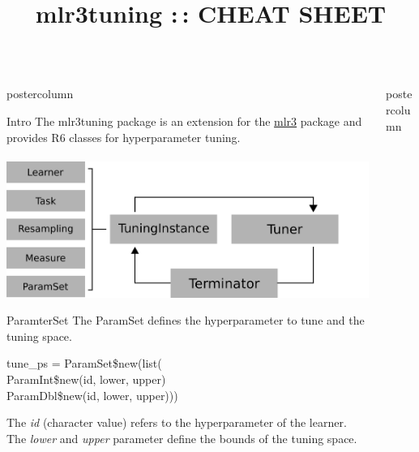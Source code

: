 \documentclass{beamer}
\title{mlr3tuning :\,: CHEAT SHEET} %
\newlength{\columnheight} %
\begin{document}
\begin{frame}[fragile]{}
	\begin{columns}
		\begin{column}{.245\textwidth}
			\begin{beamercolorbox}[center]{postercolumn}
				\begin{minipage}{.98\textwidth}
					\parbox[t][\columnheight]{\textwidth}{
						\begin{myblock}{Intro}
							The mlr3tuning package is an extension for the \href{https://github.com/mlr-org/mlr3}{mlr3} package and provides R6 classes for hyperparameter tuning.
							\\
							\\
							\includegraphics[width=\textwidth]{img/tuning_objects.png}
						\end{myblock}
						\begin{myblock}{ParamterSet}
						The ParamSet defines the hyperparameter to tune and the tuning space.
						\\
						\begin{codeboxmultiline}[width=18cm]
							tune\_ps = ParamSet\$new(list(\\
							\hspace*{1ex}ParamInt\$new(id, lower, upper)\\
							\hspace*{1ex}ParamDbl\$new(id, lower, upper)))
						\end{codeboxmultiline}
						The \textit{id} (character value) refers to the hyperparameter of the learner. The \textit{lower} and \textit{upper} parameter define the bounds of the tuning space. 	
					\end{myblock}	
					\vfill}
				\end{minipage}
			\end{beamercolorbox}
		\end{column}
		\begin{column}{.245\textwidth}
			\begin{beamercolorbox}[center]{postercolumn}

\end{beamercolorbox}
\end{column}
\end{columns}
\end{frame}
\end{document}
